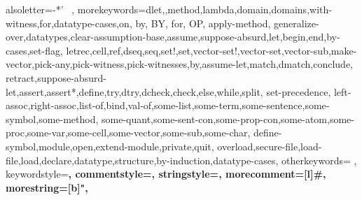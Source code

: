 \usepackage{listings}
\usepackage{listings-fix}
\usepackage{color}




 {alsoletter={-*'~%
    },
   morekeywords={dlet,,method,lambda,domain,domains,with-witness,for,datatype-cases,on,%
     by, BY, for, OP, apply-method,%
generalize-over,datatypes,clear-assumption-base,assume,suppose-absurd,let,begin,end,by-cases,set-flag,%
letrec,cell,ref,dseq,seq,set!,set,vector-set!,vector-set,vector-sub,make-vector,pick-any,pick-witness,pick-witnesses,by,assume-let,match,dmatch,conclude,%
retract,suppose-absurd-let,assert,assert*,define,try,dtry,dcheck,check,else,while,split, set-precedence,
left-assoc,right-assoc,list-of,bind,val-of,some-list,some-term,some-sentence,some-symbol,some-method,
some-quant,some-sent-con,some-prop-con,some-atom,some-proc,some-var,some-cell,some-vector,some-sub,some-char,
define-symbol,module,open,extend-module,private,quit,
overload,secure-file,load-file,load,declare,datatype,structure,by-induction,datatype-cases},
 otherkeywords={%
                },
keywordstyle=\color{kwdColor}\bfseries,
commentstyle={\rm},
stringstyle=\ttfamily,
morecomment=[l]{\#},
morestring=[b]",
}





